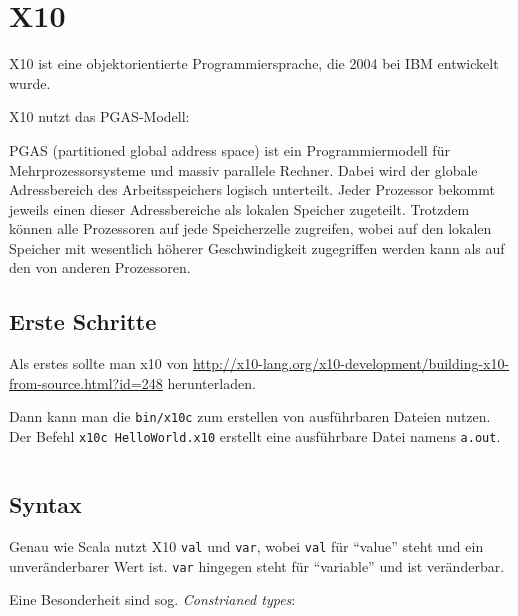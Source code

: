 \chapter{X10}%
X10 ist eine objektorientierte Programmiersprache, die 2004 bei IBM entwickelt
wurde.

X10 nutzt das PGAS-Modell:

\begin{definition}%
    PGAS (partitioned global address space) ist ein Programmiermodell für 
    Mehrprozessorsysteme und massiv parallele Rechner. Dabei wird der globale 
    Adressbereich des Arbeitsspeichers logisch unterteilt. Jeder Prozessor 
    bekommt jeweils einen dieser Adressbereiche als lokalen Speicher zugeteilt. 
    Trotzdem können alle Prozessoren auf jede Speicherzelle zugreifen, wobei auf 
    den lokalen Speicher mit wesentlich höherer Geschwindigkeit zugegriffen 
    werden kann als auf den von anderen Prozessoren.
\end{definition}

\section{Erste Schritte}
Als erstes sollte man x10 von \url{http://x10-lang.org/x10-development/building-x10-from-source.html?id=248} herunterladen.

Dann kann man die \texttt{bin/x10c} zum erstellen von ausführbaren Dateien nutzen.
Der Befehl \texttt{x10c HelloWorld.x10} erstellt eine ausführbare Datei namens
\texttt{a.out}.

\inputminted[numbersep=5pt, tabsize=4, frame=lines, label=HelloWorld.x10]{cpp}{scripts/x10/HelloWorld.x10}

\section{Syntax}
Genau wie Scala nutzt X10 \texttt{val} und \texttt{var}, wobei \texttt{val} für
\enquote{value} steht und ein unveränderbarer Wert ist. \texttt{var} hingegen
steht für \enquote{variable} und ist veränderbar.

Eine Besonderheit sind sog. \textit{Constrianed types}:

\inputminted[numbersep=5pt, tabsize=4]{scala}{scripts/x10/constrained-type-example.x10}

